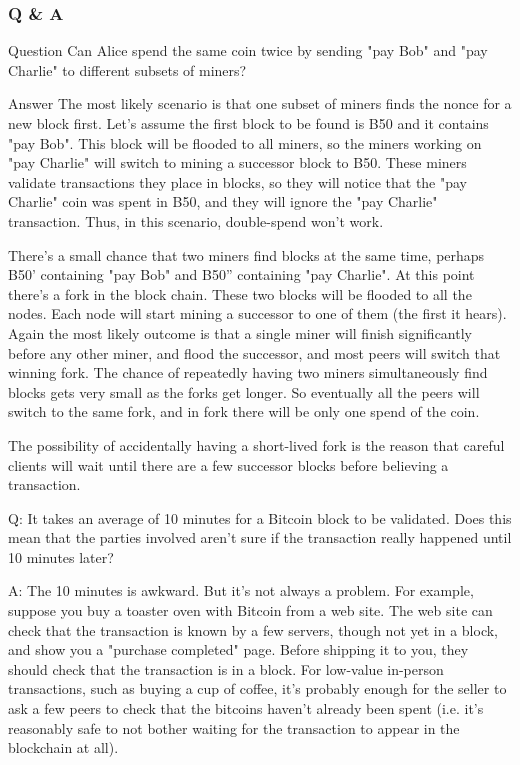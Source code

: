 \begin{frame}
    \frametitle{Q \& A}
    \begin{block}{Question}
Can Alice spend the same coin twice by sending "pay Bob" and "pay
Charlie" to different subsets of miners?
    \end{block}

    \begin{block}{Answer}
The most likely scenario is that one subset of miners finds the
nonce for a new block first. Let's assume the first block to be found
is B50 and it contains "pay Bob". This block will be flooded to all
miners, so the miners working on "pay Charlie" will switch to mining a
successor block to B50. These miners validate transactions they place
in blocks, so they will notice that the "pay Charlie" coin was spent in
B50, and they will ignore the "pay Charlie" transaction. Thus, in this
scenario, double-spend won't work.

There's a small chance that two miners find blocks at the same time,
perhaps B50' containing "pay Bob" and B50'' containing "pay Charlie". At
this point there's a fork in the block chain. These two blocks will be
flooded to all the nodes. Each node will start mining a successor to one
of them (the first it hears). Again the most likely outcome is that a
single miner will finish significantly before any other miner, and flood
the successor, and most peers will switch that winning fork. The chance
of repeatedly having two miners simultaneously find blocks gets very
small as the forks get longer. So eventually all the peers will switch
to the same fork, and in fork there will be only one spend of the coin.

The possibility of accidentally having a short-lived fork is the reason
that careful clients will wait until there are a few successor blocks
before believing a transaction.
    \end{block}
\end{frame}

\begin{frame}
Q: It takes an average of 10 minutes for a Bitcoin block to be
validated. Does this mean that the parties involved aren't sure if the
transaction really happened until 10 minutes later?
 
A: The 10 minutes is awkward. But it's not always a problem. For
example, suppose you buy a toaster oven with Bitcoin from a web site.
The web site can check that the transaction is known by a few servers,
though not yet in a block, and show you a "purchase completed" page.
Before shipping it to you, they should check that the transaction is
in a block. For low-value in-person transactions, such as buying a cup
of coffee, it's probably enough for the seller to ask a few peers to
check that the bitcoins haven't already been spent (i.e. it's
reasonably safe to not bother waiting for the transaction to appear in
the blockchain at all).
\end{frame}

